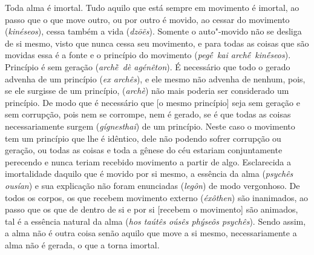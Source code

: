 Toda alma é imortal. Tudo aquilo que está sempre em movimento é imortal,
ao passo que o que move outro, ou por outro é movido, ao cessar do
movimento (\emph{kinéseos}), cessa também a vida (\emph{dzōẽs}). Somente
o auto"-movido não se desliga de si mesmo, visto que nunca cessa seu
movimento, e para todas as coisas que são movidas essa é a fonte e o
princípio do movimento (\emph{pegḗ~kai archḗ~kinḗseos}). Princípio é sem
geração (\emph{archḕ~dè agénêton}). \bekker{[245d]} É necessário que todo o
gerado advenha de um princípio (\emph{ex archês}), e ele mesmo não
advenha de nenhum, pois, se ele surgisse de um princípio,
(\emph{archè}) não mais poderia ser considerado um princípio. De modo
que é necessário que [o mesmo princípio] seja sem geração e sem
corrupção, pois nem se corrompe, nem é gerado, se é que todas as coisas
necessariamente surgem (\emph{gígnesthai}) de um princípio. Neste caso o
movimento tem um princípio que lhe é idêntico, dele não podendo sofrer
corrupção ou geração, ou todas as coisas e toda a gênese do céu estariam
conjuntamente perecendo e nunca teriam recebido movimento a partir de
algo. \bekker{[245e]} Esclarecida a imortalidade daquilo que é movido por si
mesmo, a essência da alma (\emph{psychês ousían}) e sua explicação não
foram enunciadas (\emph{legôn}) de modo vergonhoso. De todos os corpos,
os que recebem movimento externo (\emph{éxôthen}) são inanimados, ao
passo que os que de dentro de si e por si [recebem o movimento] são
animados, tal é a essência natural da alma (\emph{hos taútês oúsês
phýseôs psychês}). Sendo assim, a alma não é outra coisa senão aquilo
que move a si mesmo, necessariamente a alma não é gerada, o que a torna
imortal.

